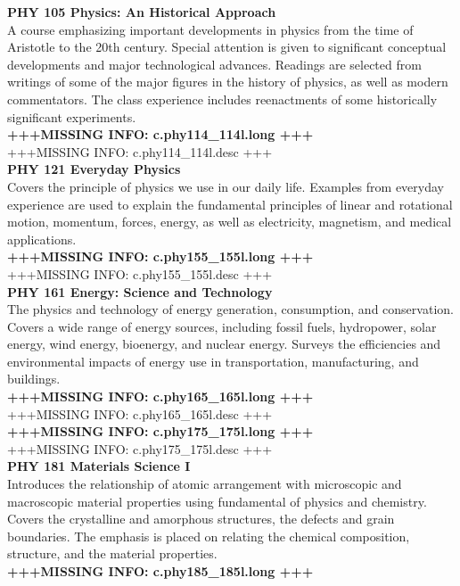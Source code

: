 \documentclass[
  letterpaper,
]{scrbook}
\begin{document}
\textbf{PHY 105 Physics: An Historical Approach}\\
A course emphasizing important developments in physics from the time of
Aristotle to the 20th century. Special attention is given to significant
conceptual developments and major technological advances. Readings are
selected from writings of some of the major figures in the history of
physics, as well as modern commentators. The class experience includes
reenactments of some historically significant experiments.\\
\textbf{+++MISSING INFO: c.phy114\_114l.long +++}\\
+++MISSING INFO: c.phy114\_114l.desc +++\\
\textbf{PHY 121 Everyday Physics}\\
Covers the principle of physics we use in our daily life. Examples from
everyday experience are used to explain the fundamental principles of
linear and rotational motion, momentum, forces, energy, as well as
electricity, magnetism, and medical applications.\\
\textbf{+++MISSING INFO: c.phy155\_155l.long +++}\\
+++MISSING INFO: c.phy155\_155l.desc +++\\
\textbf{PHY 161 Energy: Science and Technology}\\
The physics and technology of energy generation, consumption, and
conservation. Covers a wide range of energy sources, including fossil
fuels, hydropower, solar energy, wind energy, bioenergy, and nuclear
energy. Surveys the efficiencies and environmental impacts of energy use
in transportation, manufacturing, and buildings.\\
\textbf{+++MISSING INFO: c.phy165\_165l.long +++}\\
+++MISSING INFO: c.phy165\_165l.desc +++\\
\textbf{+++MISSING INFO: c.phy175\_175l.long +++}\\
+++MISSING INFO: c.phy175\_175l.desc +++\\
\textbf{PHY 181 Materials Science I}\\
Introduces the relationship of atomic arrangement with microscopic and
macroscopic material properties using fundamental of physics and
chemistry. Covers the crystalline and amorphous structures, the defects
and grain boundaries. The emphasis is placed on relating the chemical
composition, structure, and the material properties.\\
\textbf{+++MISSING INFO: c.phy185\_185l.long +++}\\
\end{document}
